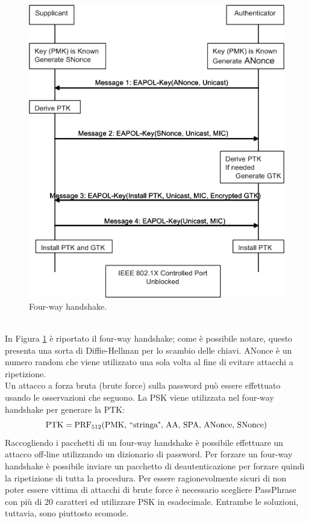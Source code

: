\begin{figure}[htbp]
	\centering
	\includegraphics[scale = 0.4]{images/four-way-handshake}
	\caption{Four-way handshake.}
	\label{img:four-way-handshake}
\end{figure}\\
In Figura \ref{img:four-way-handshake} è riportato il four-way handshake; come è possibile notare, questo presenta una sorta di Diffie-Hellman per lo scambio delle chiavi. ANonce è un numero random che viene utilizzato una sola volta al fine di evitare attacchi a ripetizione.\\
Un attacco a forza bruta (brute force) sulla password può essere effettuato usando le osservazioni che seguono. La PSK viene utilizzata nel four-way handshake per generare la PTK:
$$\text{PTK} = \text{PRF}_{512}\text{(PMK, \textquotedblleft stringa", AA, SPA, ANonce, SNonce)}$$
Raccogliendo i pacchetti di un four-way handshake è possibile effettuare un attacco off-line utilizzando un dizionario di password. Per forzare un four-way handshake è possibile inviare un pacchetto di deautenticazione per forzare quindi la ripetizione di tutta la procedura. Per essere ragionevolmente sicuri di non poter essere vittima di attacchi di brute force è necessario scegliere PassPhrase con più di 20 caratteri ed utilizzare PSK in esadecimale. Entrambe le soluzioni, tuttavia, sono piuttosto scomode.

